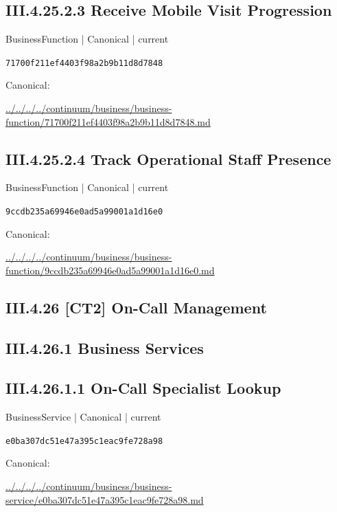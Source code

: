 \documentclass[10pt,a4paper]{article}
\begin{document}
\subsection*{III.4.25.2.3 Receive Mobile Visit Progression}
{\small BusinessFunction | Canonical | current}\par
\texttt{71700f211ef4403f98a2b9b11d8d7848}\par
Canonical: \par
{\footnotesize\url{../../../../continuum/business/business-function/71700f211ef4403f98a2b9b11d8d7848.md}}\par
\subsection*{III.4.25.2.4 Track Operational Staff Presence}
{\small BusinessFunction | Canonical | current}\par
\texttt{9ccdb235a69946e0ad5a99001a1d16e0}\par
Canonical: \par
{\footnotesize\url{../../../../continuum/business/business-function/9ccdb235a69946e0ad5a99001a1d16e0.md}}\par
\subsection*{III.4.26 [CT2] On-Call Management}
\subsection*{III.4.26.1 Business Services}
\subsection*{III.4.26.1.1 On-Call Specialist Lookup}
{\small BusinessService | Canonical | current}\par
\texttt{e0ba307dc51e47a395c1eac9fe728a98}\par
Canonical: \par
{\footnotesize\url{../../../../continuum/business/business-service/e0ba307dc51e47a395c1eac9fe728a98.md}}\par
\end{document}
